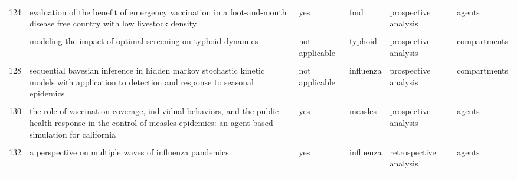 \documentclass[
]{article}
\begin{document}
\begin{landscape}
\begin{longtable}{l>{\raggedright\arraybackslash}p{3.3cm}l>{\raggedright\arraybackslash}p{3.3cm}>{\raggedright\arraybackslash}p{2cm}l}
124 & evaluation of the benefit of emergency vaccination in a foot-and-mouth disease free country with low livestock density & yes & fmd & prospective analysis & agents\\
\cellcolor{gray!6}{125} & \cellcolor{gray!6}{modeling the dynamics of oral poliovirus vaccine cessation} & \cellcolor{gray!6}{not applicable} & \cellcolor{gray!6}{poliomyelitis} & \cellcolor{gray!6}{prospective analysis} & \cellcolor{gray!6}{compartments}\\
\addlinespace
126 & modeling the impact of optimal screening on typhoid dynamics & not applicable & typhoid & prospective analysis & compartments\\
\cellcolor{gray!6}{127} & \cellcolor{gray!6}{modeling the influence of environment and intervention oncholera in haiti} & \cellcolor{gray!6}{no} & \cellcolor{gray!6}{cholera} & \cellcolor{gray!6}{retrospective analysis} & \cellcolor{gray!6}{compartments}\\
128 & sequential bayesian inference in hidden markov stochastic kinetic models with application to detection and response to seasonal epidemics & not applicable & influenza & prospective analysis & compartments\\
\cellcolor{gray!6}{129} & \cellcolor{gray!6}{simulating optimal vaccination times during cholera outbreaks} & \cellcolor{gray!6}{not applicable} & \cellcolor{gray!6}{cholera} & \cellcolor{gray!6}{prospective analysis} & \cellcolor{gray!6}{compartments}\\
130 & the role of vaccination coverage, individual behaviors, and the public health response in the control of measles epidemics: an agent-based simulation for california & yes & measles & prospective analysis & agents\\
\addlinespace
\cellcolor{gray!6}{131} & \cellcolor{gray!6}{time is (still) of the essence: quantifying the impact of emergency meningitis vaccination response in katsina state, nigeria} & \cellcolor{gray!6}{no} & \cellcolor{gray!6}{meningococcal meningitis} & \cellcolor{gray!6}{retrospective analysis} & \cellcolor{gray!6}{compartments}\\
132 & a perspective on multiple waves of influenza pandemics & yes & influenza & retrospective analysis & agents\\
\cellcolor{gray!6}{133} & \cellcolor{gray!6}{an optimal control problem arising from a dengue disease transmission model} & \cellcolor{gray!6}{not applicable} & \cellcolor{gray!6}{dengue} & \cellcolor{gray!6}{prospective analysis} & \cellcolor{gray!6}{compartments}\\

\end{longtable}
\end{landscape}
\end{document}
